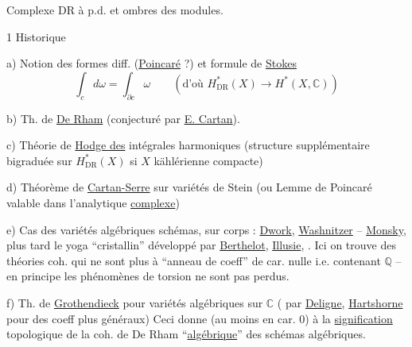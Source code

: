 Complexe DR à p.d. et ombres des modules.


1 Historique

a) Notion des formes diff. (\uline{Poincaré} ?) et formule de \uline{Stokes}
\[
\int_c d\omega=\int_{\partial c}\omega
\qquad(\text{d'où }H^*_{\mathrm{DR}}(X)\longrightarrow H^*(X,\mathbb C))
\]

b) Th. de \uline{De Rham} (conjecturé par \uline{E. Cartan}). 

c) Théorie de \uline{Hodge des} intégrales harmoniques
(structure supplémentaire bigraduée sur $H^*_{\mathrm{DR}}(X)$ si $X$ kählérienne compacte)

d) Théorème de \uline{Cartan-Serre} sur variétés de Stein
(ou Lemme de Poincaré valable dans l'analytique \uline{complexe})

e) Cas des variétés algébriques  schémas, sur corps  : \uline{Dwork}, \uline{Washnitzer} -- \uline{Monsky}, plus tard le yoga ``cristallin'' développé par \uline{Berthelot}, \uline{Illusie},   .  Ici on trouve des théories coh. qui ne sont plus à ``anneau de coeff'' de car. nulle i.e. contenant $\mathbb Q$ --  en principe les phénomènes de torsion ne sont pas perdus.

f) Th. de \uline{Grothendieck} pour variétés algébriques sur $\mathbb C$ (  par \uline{Deligne}, \uline{Hartshorne} pour des coeff plus généraux) Ceci donne  (au moins en car. 0) à la \uline{signification} topologique de la coh. de De Rham ``\uline{algébrique}'' des schémas algébriques.

